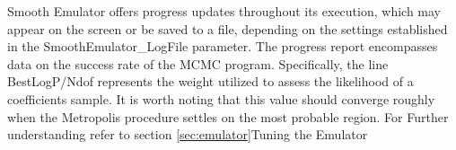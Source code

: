 \documentclass[main.tex]{subfiles}
\begin{document}
Smooth Emulator offers progress updates throughout its execution, which may appear on the screen or be saved to a file, depending on the settings established in the SmoothEmulator\_LogFile parameter. The progress report encompasses data on the success rate of the MCMC program. Specifically, the line BestLogP/Ndof represents the weight utilized to assess the likelihood of a coefficients sample. It is worth noting that this value should converge roughly when the Metropolis procedure settles on the most probable region. For Further understanding refer to section \ref{sec:emulator}{Tuning the Emulator}
\end{document}

